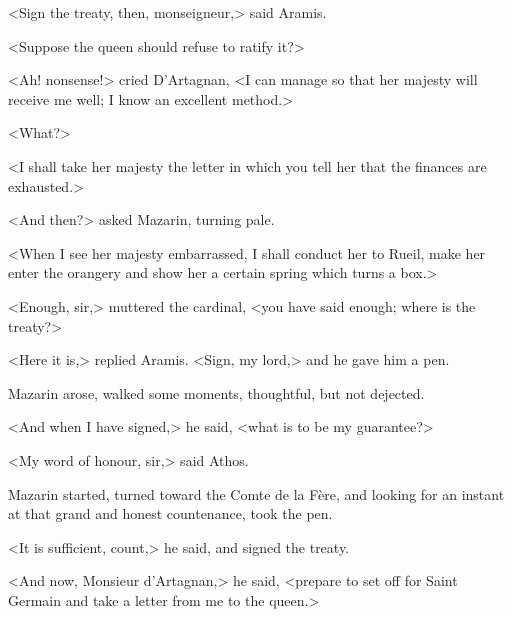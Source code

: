 <Sign the treaty, then, monseigneur,> said Aramis.

<Suppose the queen should refuse to ratify it?>

<Ah! nonsense!> cried D'Artagnan, <I can manage so that her majesty will receive me well; I know an excellent method.>

<What?>

<I shall take her majesty the letter in which you tell her that the finances are exhausted.>

<And then?> asked Mazarin, turning pale.

<When I see her majesty embarrassed, I shall conduct her to Rueil, make her enter the orangery and show her a certain spring which turns a box.>

<Enough, sir,> muttered the cardinal, <you have said enough; where is the treaty?>

<Here it is,> replied Aramis. <Sign, my lord,> and he gave him a pen.

Mazarin arose, walked some moments, thoughtful, but not dejected.

<And when I have signed,> he said, <what is to be my guarantee?>

<My word of honour, sir,> said Athos.

Mazarin started, turned toward the Comte de la Fère, and looking for an instant at that grand and honest countenance, took the pen.

<It is sufficient, count,> he said, and signed the treaty.

<And now, Monsieur d'Artagnan,> he said, <prepare to set off for Saint Germain and take a letter from me to the queen.> 